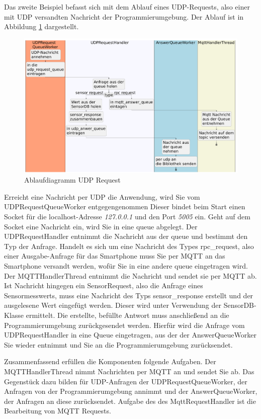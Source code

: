 \documentclass[11pt,a4paper]{report}
\begin{document}
Das zweite Beispiel befasst sich mit dem Ablauf eines UDP-Requests, also einer mit UDP versandten Nachricht der Programmierumgebung.
Der Ablauf ist in Abbildung \ref{fig:serverUDPReqPath} dargestellt.
\begin{figure}[htbp]
  \centering
  \includegraphics[width=\textwidth]{images/UDPRequestServerPath}
  \caption{Ablaufdiagramm UDP Request}
  \label{fig:serverUDPReqPath}
\end{figure}
Erreicht eine Nachricht per UDP die Anwendung, wird Sie vom UDPRequestQueueWorker entgegengenommen
Dieser bindet beim Start einen Socket für die localhost-Adresse \textit{127.0.0.1} und den Port \textit{5005}  ein.
Geht auf dem Socket eine Nachricht ein, wird Sie in eine queue abgelegt.
Der UDPRequestHandler entnimmt die Nachricht aus der queue und bestimmt den Typ der Anfrage.
Handelt es sich um eine Nachricht des Types rpc\_request, also einer Ausgabe-Anfrage für das Smartphone muss Sie per MQTT an das Smartphone versandt werden, wofür Sie in eine andere queue eingetragen wird.
Der MQTTHandlerThread entnimmt die Nachricht und sendet sie per MQTT ab.
Ist Nachricht hingegen ein SensorRequest, also die Anfrage eines Sensormesswerts, muss eine Nachricht des Typs sensor\_response erstellt und der ausgelesene Wert eingefügt werden.
Dieser wird unter Verwendung der SensorDB-Klasse ermittelt.
Die erstellte, befüllte Antwort muss anschließend an die Programmierumgebung zurückgesendet werden.
Hierfür wird die Anfrage vom UDPRequestHandler in eine Queue eingetragen, aus der der AnswerQueueWorker Sie wieder entnimmt und Sie an die Programmierumgebung zurücksendet.

Zusammenfassend erfüllen die Komponenten folgende Aufgaben.
Der MQTTHandlerThread nimmt Nachrichten per MQTT an und sendet Sie ab.
Das Gegenstück dazu bilden für UDP-Anfragen der UDPRequestQueueWorker, der Anfragen von der Programmierumgebung annimmt und der AnswerQueueWorker, der Anfragen an diese zurücksendet.
Aufgabe des des MqttRequestHandler ist die Bearbeitung von MQTT Requests.
\end{document}
